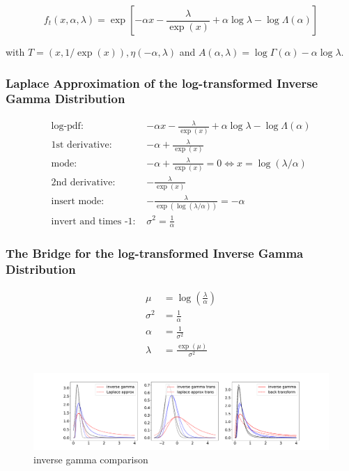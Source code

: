 \begin{equation}
	f_t(x, \alpha, \lambda) = \exp \left[-\alpha x - \frac{\lambda}{\exp(x)} + \alpha \log \lambda - \log\Lambda(\alpha)\right]
\end{equation}

with $T=(x, 1/\exp(x)), \eta(-\alpha, \lambda)$ and $A(\alpha, \lambda) = \log\Gamma(\alpha) - \alpha \log \lambda$.

\subsubsection{Laplace Approximation of the log-transformed Inverse Gamma Distribution}


\begin{align*}
\text{log-pdf: } &-\alpha x - \frac{\lambda}{\exp(x)} + \alpha \log \lambda - \log\Lambda(\alpha) \\
\text{1st derivative: }&  -\alpha + \frac{\lambda}{\exp(x)}\\
\text{mode: }&  -\alpha + \frac{\lambda}{\exp(x)} = 0 \Leftrightarrow x = \log(\lambda/\alpha)\\
\text{2nd derivative: }&  -\frac{\lambda}{\exp(x)}\\
\text{insert mode: }&  -\frac{\lambda}{\exp(\log(\lambda/\alpha))} = -\alpha\\
\text{invert and times -1: }&\sigma^2 = \frac{1}{\alpha}
\end{align*}

\subsubsection{The Bridge for the log-transformed Inverse Gamma Distribution}

\begin{align}
	\mu &= \log\left(\frac{\lambda}{\alpha}\right) \\
	\sigma^2 &= \frac{1}{\alpha} \\
	\alpha &= \frac{1}{\sigma^2}\\
	\lambda &= \frac{\exp(\mu)}{\sigma^2}\\
\end{align}

\begin{figure}
	\centering
	\includegraphics[width=\textwidth]{figures/inverse_gamma_playground.pdf}
	\caption{inverse gamma comparison}
	\label{fig:inverse_gamma_comparison}
\end{figure}